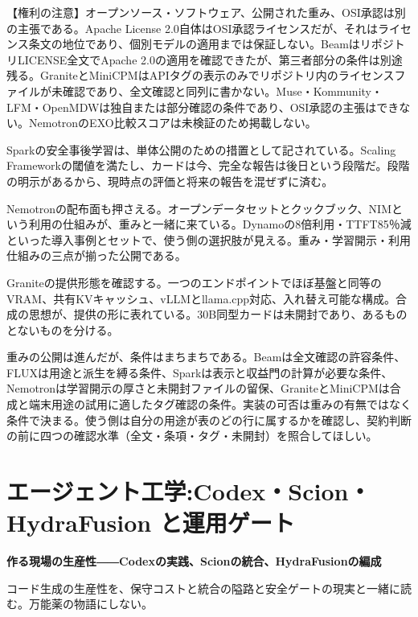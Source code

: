 \documentclass[lualatex,a4paper,10pt]{jlreq}
\begin{document}
\begin{tcolorbox}[colback=SurveySoft,colframe=SurveyRule,arc=1mm,boxrule=0.4pt,left=2mm,right=2mm]
【権利の注意】オープンソース・ソフトウェア、公開された重み、OSI承認は別の主張である。Apache License 2.0自体はOSI承認ライセンスだが、それはライセンス条文の地位であり、個別モデルの適用までは保証しない。BeamはリポジトリLICENSE全文でApache 2.0の適用を確認できたが、第三者部分の条件は別途残る。GraniteとMiniCPMはAPIタグの表示のみでリポジトリ内のライセンスファイルが未確認であり、全文確認と同列に書かない。Muse・Kommunity・LFM・OpenMDWは独自または部分確認の条件であり、OSI承認の主張はできない。NemotronのEXO比較スコアは未検証のため掲載しない。
\end{tcolorbox}
\cite{B14,B70,B15,B13,B71,B17,B19,B18}


Sparkの安全事後学習は、単体公開のための措置として記されている。Scaling Frameworkの閾値を満たし、カードは今、完全な報告は後日という段階だ。段階の明示があるから、現時点の評価と将来の報告を混ぜずに済む。
\cite{B14,B70,B15,B13,B71}


Nemotronの配布面も押さえる。オープンデータセットとクックブック、NIMという利用の仕組みが、重みと一緒に来ている。Dynamoの8倍利用・TTFT85％減といった導入事例とセットで、使う側の選択肢が見える。重み・学習開示・利用仕組みの三点が揃った公開である。
\cite{B21,B72,B22,B20}


Graniteの提供形態を確認する。一つのエンドポイントでほぼ基盤と同等のVRAM、共有KVキャッシュ、vLLMとllama.cpp対応、入れ替え可能な構成。合成の思想が、提供の形に表れている。30B同型カードは未開封であり、あるものとないものを分ける。
\cite{B24,B73,B23,B25}


重みの公開は進んだが、条件はまちまちである。Beamは全文確認の許容条件、FLUXは用途と派生を縛る条件、Sparkは表示と収益門の計算が必要な条件、Nemotronは学習開示の厚さと未開封ファイルの留保、GraniteとMiniCPMは合成と端末用途の試用に適したタグ確認の条件。実装の可否は重みの有無ではなく条件で決まる。使う側は自分の用途が表のどの行に属するかを確認し、契約判断の前に四つの確認水準（全文・条項・タグ・未開封）を照合してほしい。
\cite{B14,B70,B15,B13,B71,B17,B19,B18}


\section{エージェント工学:Codex・Scion・HydraFusion と運用ゲート}
\label{sec:P4}

{\Large\bfseries 作る現場の生産性――Codexの実践、Scionの統合、HydraFusionの編成\par}
\smallskip
{\color{SurveyMuted}コード生成の生産性を、保守コストと統合の隘路と安全ゲートの現実と一緒に読む。万能薬の物語にしない。\par}
\bigskip
\end{document}

